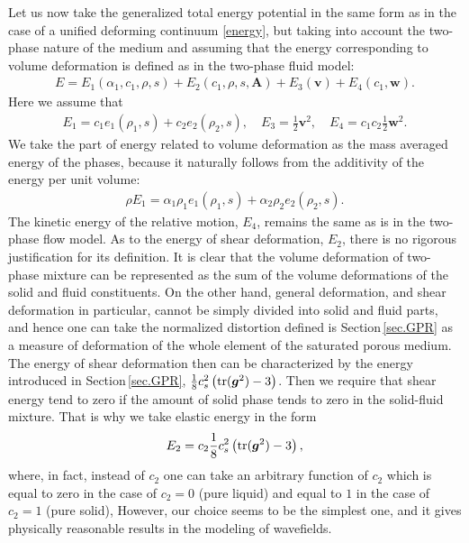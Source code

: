 \documentclass[3p,times,table]{article}
\renewcommand{\AA}{{\bm{A}}}
\renewcommand{\ggg}{{\bm{g}}}
\newcommand{\vv}{{\bm{v}}}
\newcommand{\ww}{{\bm{w}}}
\newcommand{\tr}{\textnormal{tr}}
\begin{document}
Let us now take the generalized total energy potential in the same form as in 
the case 
of a unified deforming continuum \eqref{energy}, but taking into account 
the two-phase nature of the medium and assuming that the energy corresponding to  
volume deformation is defined as in the two-phase fluid model: 
\begin{align}
E=E_1(\alpha_1, c_1, \rho, s)+E_2(c_1,\rho,s,\AA)+E_3(\vv)+E_4(c_1,\ww). 
\label{energy.SF}
\end{align}
Here we assume that 
\begin{align} \label{energy12.SF}
E_1=c_1e_1(\rho_1,s)+c_2e_2(\rho_2,s), \quad
E_3=\frac{1}{2}\vv^2, \quad E_4=c_1c_2\frac{1}{2}\ww^2.
\end{align}
We take the part of energy related to volume deformation as the mass 
averaged energy of the phases, because it naturally follows from the additivity 
of the energy per unit volume:
\begin{align} \label{energy.mix}
\rho E_1=\alpha_1 \rho_1e_1(\rho_1,s)+\alpha_2 \rho_2 e_2(\rho_2,s). 
\end{align}
The kinetic energy of the relative motion, $E_4$, remains the same as is in the 
two-phase flow model.
As to the energy of shear deformation, $E_2$, there is no rigorous 
justification for its definition. It is clear that the volume deformation of 
two-phase mixture can be represented as the sum of the volume deformations of the solid 
and fluid constituents. On the other hand, general deformation, and shear 
deformation in particular, cannot be 
simply divided into solid and fluid parts, and hence one can take the 
normalized 
distortion 
defined is Section\,\ref{sec.GPR} as a measure of deformation of the whole element 
of the saturated porous medium. The energy of shear deformation then can be 
characterized by the energy introduced in Section\,\ref{sec.GPR},
$
\frac18c_s^2\left(\tr({\ggg^2})-3\right)
$. 
Then we require that shear energy tend to zero 
if the amount of solid phase tends to zero in the solid-fluid mixture. That is why we take elastic  
energy in the form
\begin{align} \label{energy,shear}
E_2=c_2 \frac{1}{8}c_s^2\left(\tr({\ggg^2})-3\right),
\end{align}
where, in fact, instead of $c_2$ one can take an arbitrary 
function of $c_2$ which is equal to zero in the case of $c_2=0$ (pure liquid) 
and 
equal to $1$ in the case of $c_2=1$ (pure solid),
However, our choice seems to be the simplest one, and it gives physically 
reasonable results in the modeling of wavefields.
\end{document}
